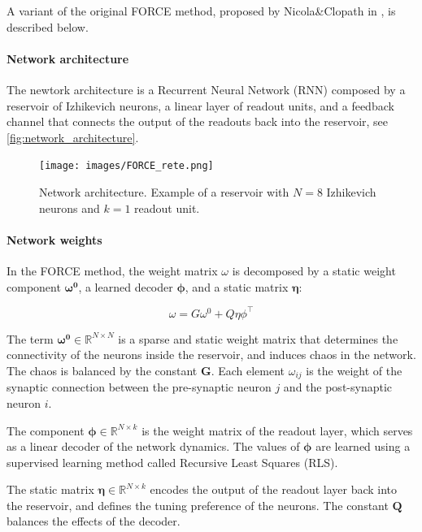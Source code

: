 \documentclass[10pt,a4paper, final]{report} %
\begin{document}
A variant of the original FORCE method, proposed by Nicola\&Clopath in \cite{nicola2017supervised}, is described below. 


\paragraph{Network architecture}
The newtork architecture is a Recurrent Neural Network (RNN) composed by a reservoir of Izhikevich neurons, a linear layer of readout units, and a feedback channel that connects the output of the readouts back into the reservoir, see \autoref{fig:network_architecture}.

\begin{figure}[H]
\centering
\texttt{[image: images/FORCE\_rete.png]}
\caption{Network architecture. Example of a reservoir with $N=8$ Izhikevich neurons and $k=1$ readout unit.}
\label{fig:network_architecture}
\end{figure}

\paragraph{Network weights}
In the FORCE method, the weight matrix $\omega$ is decomposed by a static weight component $\bm{\omega^0}$, a learned decoder $\bm{\phi}$, and a static matrix $\bm{\eta}$:

\begin{equation}
\omega = G \omega^0 + Q \eta \phi^{\intercal}
\label{eq:force_matrix}
\end{equation}

The term $\bm{\omega^0} \in \mathbb{R}^{N \times N}$ is a sparse and static weight matrix that determines the connectivity of the neurons inside the reservoir, and induces chaos in the network. The chaos is balanced by the constant $\bm{G}$. Each element $\omega_{ij}$ is the weight of the synaptic connection between the pre-synaptic neuron $j$ and the post-synaptic neuron $i$. 

The component $\bm{\phi} \in \mathbb{R}^{N \times k}$ is the weight matrix of the readout layer, which serves as a linear decoder of the network dynamics. The values of $\bm{\phi}$ are learned using a supervised learning method called Recursive Least Squares (RLS).

The static matrix $\bm{\eta} \in \mathbb{R}^{N \times k}$ encodes the output of the readout layer back into the reservoir, and defines the tuning preference of the neurons. The constant $\bm{Q}$ balances the effects of the decoder. 
\end{document}
